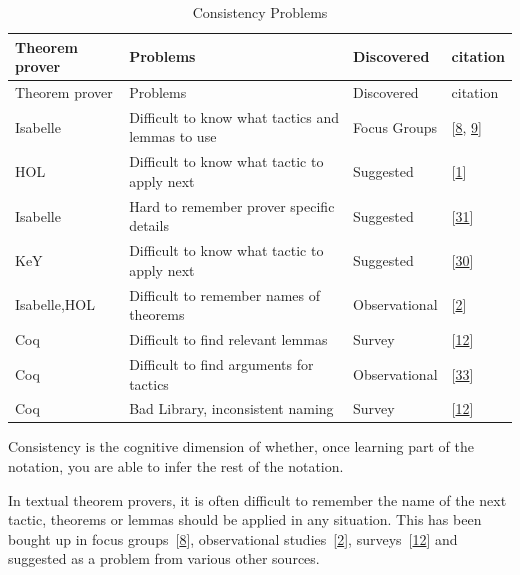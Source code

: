\documentclass[
]{article}
\begin{document}
\hypertarget{tbl:consistency}{}
\begin{longtable}[]{@{}llll@{}}
\caption{\label{tbl:consistency}Consistency Problems}\tabularnewline
\toprule
Theorem prover & Problems & Discovered & citation \\
\midrule
\endfirsthead
\toprule
Theorem prover & Problems & Discovered & citation \\
\midrule
\endhead
Isabelle & Difficult to know what tactics and lemmas to use & Focus
Groups & {[}\protect\hyperlink{ref-beckert_usability_2015}{8},
\protect\hyperlink{ref-beckert_interaction_2017}{9}{]} \\
HOL & Difficult to know what tactic to apply next & Suggested &
{[}\protect\hyperlink{ref-aitken_interactive_1998}{1}{]} \\
Isabelle & Hard to remember prover specific details & Suggested &
{[}\protect\hyperlink{ref-nagashima_pamper_2018}{31}{]} \\
KeY & Difficult to know what tactic to apply next & Suggested &
{[}\protect\hyperlink{ref-mitsch_keymaera_2017}{30}{]} \\
Isabelle,HOL & Difficult to remember names of theorems & Observational &
{[}\protect\hyperlink{ref-aitken_analysis_2000}{2}{]} \\
Coq & Difficult to find relevant lemmas & Survey &
{[}\protect\hyperlink{ref-berman_development_2014}{12}{]} \\
Coq & Difficult to find arguments for tactics & Observational &
{[}\protect\hyperlink{ref-ringer_replica_2020}{33}{]} \\
Coq & Bad Library, inconsistent naming & Survey &
{[}\protect\hyperlink{ref-berman_development_2014}{12}{]} \\
\bottomrule
\end{longtable}

Consistency is the cognitive dimension of whether, once learning part of
the notation, you are able to infer the rest of the notation.

In textual theorem provers, it is often difficult to remember the name
of the next tactic, theorems or lemmas should be applied in any
situation. This has been bought up in focus
groups~{[}\protect\hyperlink{ref-beckert_usability_2015}{8}{]},
observational
studies~{[}\protect\hyperlink{ref-aitken_analysis_2000}{2}{]},
surveys~{[}\protect\hyperlink{ref-berman_development_2014}{12}{]} and
suggested as a problem from various other sources.
\end{document}
